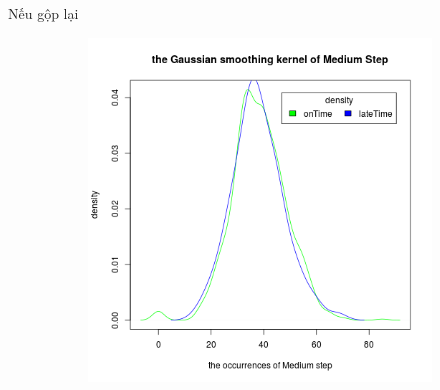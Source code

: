 \documentclass[a4paper, 13pt]{report}
\begin{document}
\FloatBarrier
Nếu gộp lại \\
\FloatBarrier
\begin{figure}[h]
    \begin{subfigure}[b]{0.7\textwidth}
        \includegraphics[width=\textwidth]{DensityMediumStep.png}
    \end{subfigure}
\end{figure}
\FloatBarrier
\end{document}

